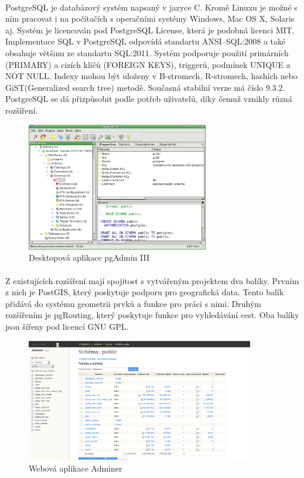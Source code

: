 \documentclass[11pt,a4paper,titlepage,oneside]{book}
\begin{document}
		\paragraph{}PostgreSQL je databázový systém napsaný v jazyce C. Kromě Linuxu je možné s ním pracovat i na počítačích s operačními systémy Windows, Mac OS X, Solaris aj. Systém je licencován pod PostgreSQL License, která je podobná licenci MIT.  Implementace SQL v PostgreSQL  odpovídá standartu ANSI--SQL:2008\cite{postgresql} a také obsahuje většinu ze standartu SQL:2011\cite{wiki_postgresql}. Systém podporuje použití primárních (PRIMARY) a cizích klíčů (FOREIGN KEYS), triggerů, podmínek UNIQUE a NOT NULL. Indexy mohou být uloženy v B-stromech, R-stromech, hashích nebo GiST(Generalized search tree) metodě. Současná stabilní verze má číslo 9.3.2. PostgreSQL se dá přizpůsobit podle potřeb uživatelů, díky čemuž vznikly různá rozšíření. 
		\begin{figure}[!h]
			\begin{center}
				\includegraphics[width=8cm]{obrazky/pgadmin3.png}
				\caption{Desktopová aplikace pgAdmin III}
				\label{fig:pgadmin}
			\end{center}
		\end{figure}
		\paragraph{}Z existujících rozšíření mají spojitost s vytvářeným projektem dva balíky. Prvním z nich je PostGIS, který poskytuje podporu pro geografická data. Tento balík přidává do systému geometrii prvků a funkce pro práci s nimi. Druhým rozšířením je pgRouting, který poskytuje funkce pro vyhledávání cest. Oba balíky jsou šířeny pod licencí GNU GPL.
		\begin{figure}[!h]
			\begin{center}
				\includegraphics[width=10cm]{obrazky/adminer.png}
				\caption{Webová aplikace Adminer}
				\label{fig:adminer}
			\end{center}
		\end{figure}			
\end{document}
